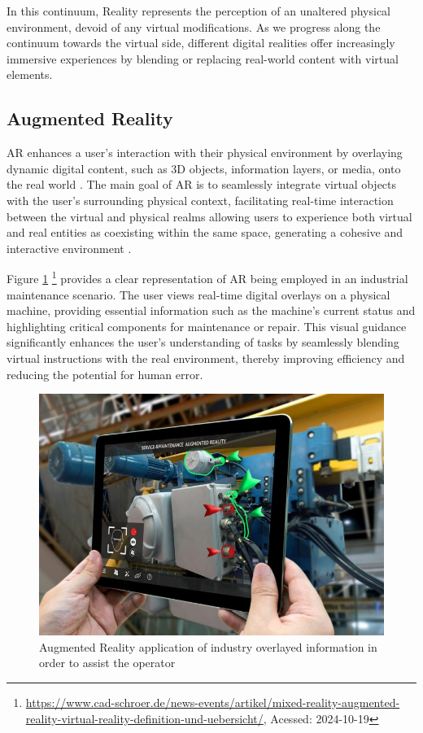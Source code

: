 In this continuum, Reality represents the perception of an unaltered physical environment, devoid of any virtual modifications. As we progress along the continuum towards the virtual side, different digital realities offer increasingly immersive experiences by blending or replacing real-world content with virtual elements.

\subsection{Augmented Reality}
    \ac{AR} enhances a user's interaction with their physical environment by overlaying dynamic digital content, such as 3D objects, information layers, or media, onto the real world \cite{liu2022digitaltwin}. The main goal of \ac{AR} is to seamlessly integrate virtual objects with the user's surrounding physical context, facilitating real-time interaction between the virtual and physical realms allowing users to experience both virtual and real entities as coexisting within the same space, generating a cohesive and interactive environment \cite{Azuma1997}.
    
    Figure \ref{f:ar-example} \footnote{\url{https://www.cad-schroer.de/news-events/artikel/mixed-reality-augmented-reality-virtual-reality-definition-und-uebersicht/}, Acessed: 2024-10-19} provides a clear representation of \ac{AR} being employed in an industrial maintenance scenario. The user views real-time digital overlays on a physical machine, providing essential information such as the machine’s current status and highlighting critical components for maintenance or repair. This visual guidance significantly enhances the user’s understanding of tasks by seamlessly blending virtual instructions with the real environment, thereby improving efficiency and reducing the potential for human error.

    \begin{figure}[!htpb]
        \centering
        \includegraphics[width=0.6\linewidth]{figs/ar-example.jpg}
        \caption{Augmented Reality application of industry overlayed information in order to assist the operator}
        \label{f:ar-example}
    \end{figure}

